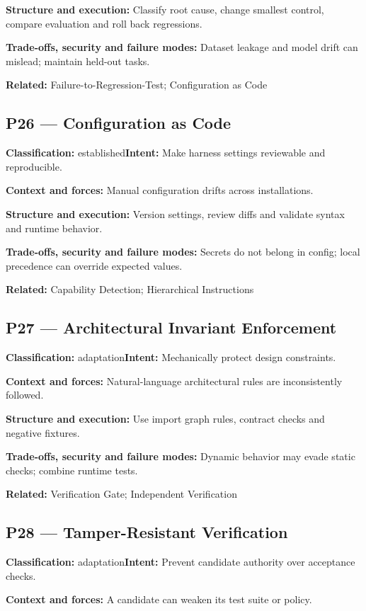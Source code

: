 \documentclass[11pt,letterpaper]{article}
\begin{document}
\textbf{Structure and execution:} Classify root cause, change smallest control, compare evaluation and roll back regressions.

\textbf{Trade-offs, security and failure modes:} Dataset leakage and model drift can mislead; maintain held-out tasks.

\textbf{Related:} Failure-to-Regression-Test; Configuration as Code

\subsection*{P26 --- Configuration as Code}
\textbf{Classification:} established\quad\textbf{Intent:} Make harness settings reviewable and reproducible.

\textbf{Context and forces:} Manual configuration drifts across installations.

\textbf{Structure and execution:} Version settings, review diffs and validate syntax and runtime behavior.

\textbf{Trade-offs, security and failure modes:} Secrets do not belong in config; local precedence can override expected values.

\textbf{Related:} Capability Detection; Hierarchical Instructions

\subsection*{P27 --- Architectural Invariant Enforcement}
\textbf{Classification:} adaptation\quad\textbf{Intent:} Mechanically protect design constraints.

\textbf{Context and forces:} Natural-language architectural rules are inconsistently followed.

\textbf{Structure and execution:} Use import graph rules, contract checks and negative fixtures.

\textbf{Trade-offs, security and failure modes:} Dynamic behavior may evade static checks; combine runtime tests.

\textbf{Related:} Verification Gate; Independent Verification

\subsection*{P28 --- Tamper-Resistant Verification}
\textbf{Classification:} adaptation\quad\textbf{Intent:} Prevent candidate authority over acceptance checks.

\textbf{Context and forces:} A candidate can weaken its test suite or policy.
\end{document}
